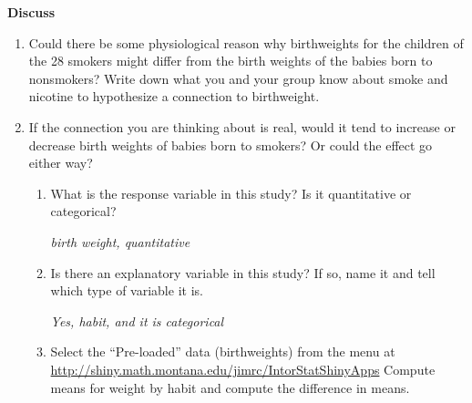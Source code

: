 {\bf Discuss}
\begin{enumerate}
\item   Could there be some physiological reason why birthweights for
  the children of the 28 smokers might differ from the birth weights
  of the babies born to nonsmokers?  Write down what you and your
  group know about smoke and nicotine to hypothesize a connection to
  birthweight. 
\begin{students}
  \vspace{2cm}
\end{students}


\item   If the connection you are thinking about is real, would it
  tend to increase or decrease birth weights of babies born to
  smokers?  Or could the effect go either way?
\begin{students}
  \vspace{1cm}
\end{students}

\begin{enumerate}
\item   What is the response variable in this study?  Is it
  quantitative or categorical?
\begin{students}
  \vspace{1cm}
\end{students}

\begin{key}
  {\it birth weight, quantitative}
\end{key}
  
\item  Is there an explanatory variable in this study?  If so, name it
  and tell which type of variable it is.
\begin{students}
\vspace{1.5cm}
\end{students}

\begin{key}
  {\it Yes, habit, and it  is categorical}
\end{key}

  
\item Select the ``Pre-loaded'' data (birthweights)  from the
   menu at 
  \url{http://shiny.math.montana.edu/jimrc/IntorStatShinyApps}
   Compute means for weight by habit and compute the difference in means.
\begin{students}
\vspace{2cm}
\end{students}


\end{enumerate}
\end{enumerate}
